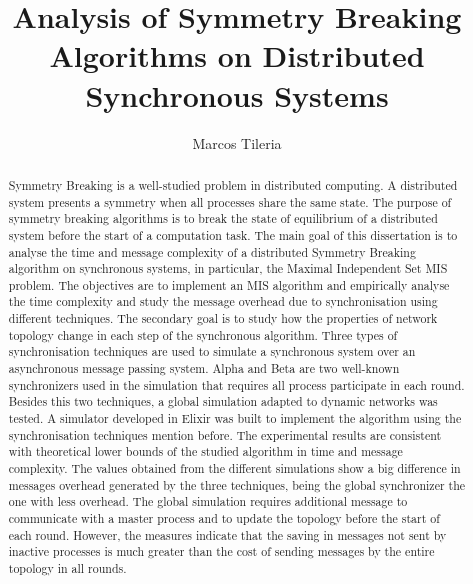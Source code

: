\documentclass[11pt]{article} %
\title{Analysis of Symmetry Breaking Algorithms on Distributed Synchronous Systems}
\author{Marcos Tileria}
\theoremstyle{plain}
\theoremstyle{definition}
\begin{document}
\maketitle

\declaration

\begin{abstract}


Symmetry Breaking is a well-studied problem in distributed computing. A distributed system presents a symmetry when all processes share the same state. The purpose of symmetry breaking algorithms is to break the state of equilibrium of a distributed system before the start of a computation task. The main goal of this dissertation is to analyse the time and message complexity of a distributed Symmetry Breaking algorithm on synchronous systems, in particular, the Maximal Independent Set MIS problem. The objectives are to implement an MIS algorithm and empirically analyse the time complexity and study the message overhead due to synchronisation using different techniques. The secondary goal is to study how the properties of network topology change in each step of the synchronous algorithm. Three types of synchronisation techniques are used to simulate a synchronous system over an asynchronous message passing system. Alpha and Beta are two well-known synchronizers used in the simulation that requires all process participate in each round. Besides this two techniques, a global simulation adapted to dynamic networks was tested. A simulator developed in Elixir was built to implement the algorithm using the synchronisation techniques mention before. The experimental results are consistent with theoretical lower bounds of the studied algorithm in time and message complexity. The values obtained from the different simulations show a big difference in messages overhead generated by the three techniques, being the global synchronizer the one with less overhead. The global simulation requires additional message to communicate with a master process and to update the topology before the start of each round. However, the measures indicate that the saving in messages not sent by inactive processes is much greater than the cost of sending messages by the entire topology in all rounds.
 
\end{abstract}




 \newpage




 \newpage


\newpage


 \newpage


 \newpage


 \newpage


 \newpage




\end{document}
